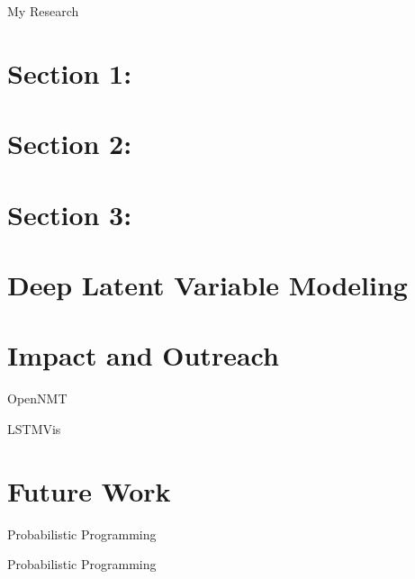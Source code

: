 \documentclass{beamer}
\begin{document}
\begin{frame}{My Research}
\end{frame}


\section{Section 1:}

\section{Section 2:}
\begin{frame}

\end{frame}

\section{Section 3:}

\section{Deep Latent Variable Modeling}

\begin{frame}

\end{frame}

\begin{frame}

\end{frame}

\begin{frame}

\end{frame}

\section{Impact and Outreach}

\begin{frame}{OpenNMT}

\end{frame}

\begin{frame}{LSTMVis}

\end{frame}



\section{Future Work}

\begin{frame}{Probabilistic Programming}

\end{frame}

\begin{frame}{Probabilistic Programming}

\end{frame}


\begin{frame}

\end{frame}



\end{document}
